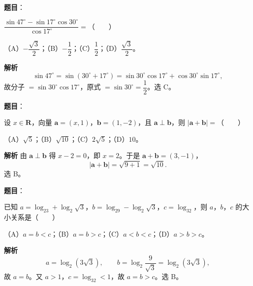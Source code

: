 \begin{answer}

\textbf{题目}：

$\dfrac{\sin47^\circ-\sin17^\circ\cos30^\circ}{\cos17^\circ}=$\mbox{（　　）}

（A）$-\dfrac{\sqrt3}2$；（B）$-\dfrac12$；（C）$\dfrac12$；（D）$\dfrac{\sqrt3}2$。

\textbf{解析}
\nopagebreak[4]
\[\sin47^\circ=\sin(30^\circ+17^\circ)=\sin30^\circ\cos17^\circ+\cos30^\circ\sin17^\circ,\]
故分子 $=\sin30^\circ\cos17^\circ$，原式 $=\sin30^\circ=\dfrac12$。选 C。


\end{answer}
\begin{answer}

\textbf{题目}：

设 $x\in\mathbf R$，向量 $\boldsymbol a=(x,1)$，$\boldsymbol b=(1,-2)$，且 $\boldsymbol a\perp\boldsymbol b$，则 $|\boldsymbol a+\boldsymbol b|=$\mbox{（　　）}

（A）$\sqrt5$；（B）$\sqrt{10}$；（C）$2\sqrt5$；（D）$10$。

\textbf{解析}
由 $\boldsymbol a\perp\boldsymbol b$ 得 $x-2=0$，即 $x=2$。于是 $\boldsymbol a+\boldsymbol b=(3,-1)$，
\nopagebreak[4]
\[|\boldsymbol a+\boldsymbol b|=\sqrt{9+1}=\sqrt{10}.\]
选 B。


\end{answer}
\begin{answer}

\textbf{题目}：

已知 $a=\log_23+\log_2\sqrt3$，$b=\log_29-\log_2\sqrt3$，$c=\log_32$，则 $a$，$b$，$c$ 的大小关系是\mbox{（　　）}

（A）$a=b<c$；（B）$a=b>c$；（C）$a<b<c$；（D）$a>b>c$。

\textbf{解析}
\nopagebreak[4]
\[a=\log_2(3\sqrt3),\qquad b=\log_2\frac9{\sqrt3}=\log_2(3\sqrt3),\]
故 $a=b$。又 $a>1$，$c=\log_32<1$，故 $a=b>c$。选 B。


\end{answer}
